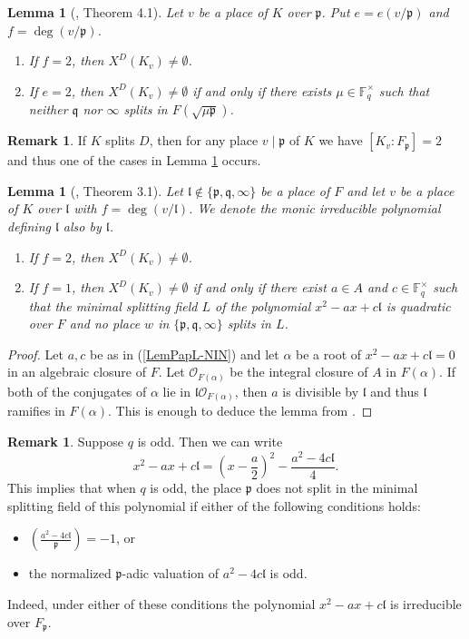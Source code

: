 \documentclass[10pt]{amsart}
\theoremstyle{plain}
\newtheorem{lem}[thm]{Lemma}
\theoremstyle{definition}
\newtheorem{rmk}[thm]{Remark}
\newcommand{\cO}{\mathcal{O}}
\newcommand{\bF}{\mathbb{F}}
\newcommand{\frl}{\mathfrak{l}}
\newcommand{\frp}{\mathfrak{p}}
\newcommand{\frq}{\mathfrak{q}}
\begin{document}
\begin{lem}[\cite{Pap_loc}, Theorem 4.1]\label{LemPapP}
	Let $v$ be a place of $K$ over $\frp$. Put $e=e(v/\frp)$ and $f=\deg(v/\frp)$.
	\begin{enumerate}
		\item If $f=2$, then $X^D(K_{v})\neq\emptyset$.
		\item If $e=2$, then $X^D(K_{v})\neq\emptyset$ if and only if 
		there exists $\mu\in \bF_q^\times$ such that neither $\frq$ nor $\infty$ splits in $F(\sqrt{\mu \frp})$.
	\end{enumerate}
\end{lem}
\begin{rmk}\label{RmkSplitP}
	If $K$ splits $D$, then for any place $v\mid \frp$ of $K$ we have $[K_v:F_\frp]=2$ and thus one of the cases in Lemma \ref{LemPapP} occurs.
\end{rmk}

\begin{lem}[\cite{Pap_loc}, Theorem 3.1]\label{LemPapL}
	Let $\frl\notin\{\frp,\frq,\infty\}$ be a place of $F$ and let $v$ be a place of $K$ over $\frl$ with $f=\deg(v/\frl)$.
	We denote the monic irreducible polynomial defining $\frl$ also by $\frl$.
	\begin{enumerate}
		\item\label{LemPapL-IN} If $f=2$, then $X^D(K_{v})\neq\emptyset$.
		\item\label{LemPapL-NIN} If $f=1$, then $X^D(K_{v})\neq\emptyset$ if and only if there exist $a\in A$ and $c\in \bF_q^\times$ such that 
		the minimal splitting field $L$ of the polynomial $x^2-ax+c\frl$ is quadratic over $F$ and no place $w$ in $\{\frp,\frq,\infty\}$ splits in $L$.
	\end{enumerate} 
\end{lem}
\begin{proof}
	Let $a,c$ be as in (\ref{LemPapL-NIN}) and let $\alpha$ be a root of $x^2-ax+c\frl=0$ in an algebraic closure of $F$. 
	Let $\cO_{F(\alpha)}$ be the integral closure of $A$ in $F(\alpha)$.
	If both of the conjugates of $\alpha$ lie in $\frl \cO_{F(\alpha)}$, 
	then $a$ is divisible by $\frl$ and thus $\frl$ ramifies in $F(\alpha)$.
	This is enough to deduce the lemma from \cite[Theorem 3.1]{Pap_loc}. 
\end{proof}

\begin{rmk}\label{RmkNonSplitL}
	Suppose $q$ is odd. Then we can write
	\[
	x^2-ax+c\frl=\left(x-\frac{a}{2}\right)^2-\frac{a^2-4 c\frl}{4}.
	\]
	This implies that when $q$ is odd, the place $\frp$ does not split in the minimal splitting field of this polynomial if either of the following conditions 
	holds:
	\begin{itemize}
		\item $(\frac{a^2-4c\frl}{\frp})=-1$, or
		\item the normalized $\frp$-adic valuation of $a^2-4c\frl$ is odd.
	\end{itemize}
	Indeed, under either of these conditions the polynomial $x^2-ax+c\frl$ is irreducible over $F_\frp$.
\end{rmk}
\end{document}
